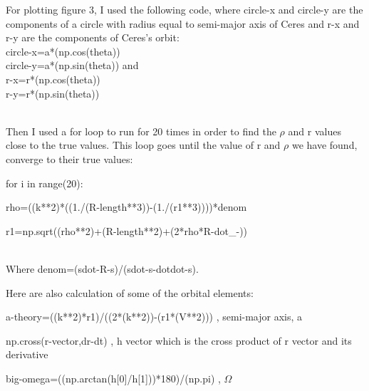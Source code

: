 \documentclass[letterpaper,12pt]{article}
\begin{document}
\*For plotting figure 3, I used the following code, where circle-x and circle-y are the components of a circle with radius equal to semi-major axis of Ceres and r-x  and r-y are the components of Ceres's orbit:
\\circle-x=a*(np.cos(theta))
\\circle-y=a*(np.sin(theta))
 and 
\\r-x=r*(np.cos(theta))
\\r-y=r*(np.sin(theta))


\\Then I used a for loop to run for 20 times in order to find the \begin{math} \rho \end{math} and r values close to the true values. This loop goes until the value of r and \begin{math} \rho \end{math} we have found, converge to their true values:

for i in range(20):

rho=((k**2)*((1./(R-length**3))-(1./(r1**3))))*denom

r1=np.sqrt((rho**2)+(R-length**2)+(2*rho*R-dot_-))
    
\\Where denom=(sdot-R-s)/(sdot-s-dotdot-s).

Here are also calculation of some of the orbital elements:

a-theory=((k**2)*r1)/((2*(k**2))-(r1*(V**2)))     ,   semi-major axis, a

np.cross(r-vector,dr-dt)    ,   h vector which is the cross product of r vector and its derivative

big-omega=((np.arctan(h[0]/h[1]))*180)/(np.pi)    ,  \begin{math} \Omega \end{math}


 

\end{document}

